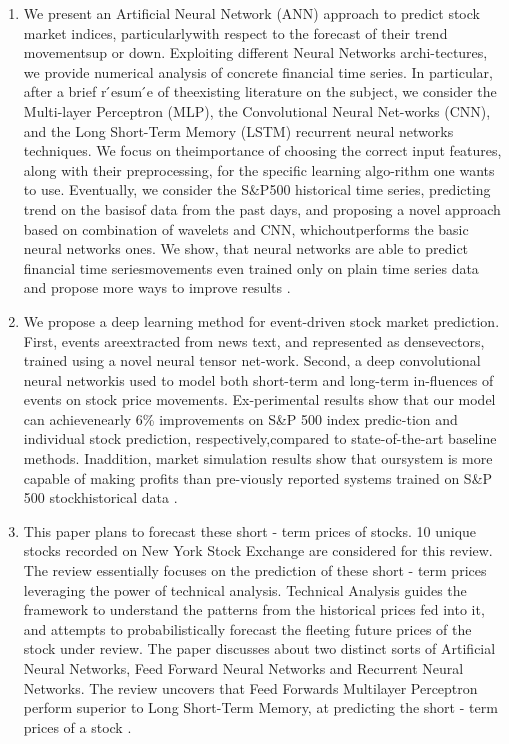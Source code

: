 \documentclass[12pt,journal,compsoc]{IEEEtran}
\begin{document}
\begin{enumerate}
	\item We present an Artificial Neural Network (ANN) approach to predict stock market indices, particularlywith respect to the forecast of their trend movementsup or down.  Exploiting different Neural Networks archi-tectures, we provide numerical analysis of concrete financial time series.  In particular, after a brief r ́esum ́e of theexisting literature on the subject, we consider the Multi-layer Perceptron (MLP), the Convolutional Neural Net-works (CNN), and the Long Short-Term Memory (LSTM) recurrent neural networks techniques. We focus on theimportance of choosing the correct input features, along with their preprocessing, for the specific learning algo-rithm one wants to use.  Eventually, we consider the S\&P500 historical time series, predicting trend on the basisof data from the past days, and proposing a novel approach based on combination of wavelets and CNN, whichoutperforms the basic neural networks ones. We show, that neural networks are able to predict financial time seriesmovements even trained only on plain time series data and propose more ways to improve results \cite{di2016artificial}.
	
	\item We  propose  a  deep  learning  method  for  event-driven  stock  market  prediction.   First,  events  areextracted from news text, and represented as densevectors,  trained  using  a  novel  neural  tensor  net-work. Second, a deep convolutional neural networkis used to model both short-term and long-term in-fluences of events on stock price movements.  Ex-perimental results show that our model can achievenearly 6\% improvements on S\&P 500 index predic-tion  and  individual  stock  prediction,  respectively,compared to state-of-the-art baseline methods.  Inaddition,  market  simulation  results  show  that  oursystem is more capable of making profits than pre-viously reported systems trained on S\&P 500 stockhistorical data \cite{ding2015deep}.
	
	\item  This paper plans to forecast these short - term prices of stocks. 10 unique stocks recorded on New York Stock Exchange are considered for this review. The review essentially focuses on the prediction of these short - term prices leveraging the power of technical analysis. Technical Analysis guides the framework to understand the patterns from the historical prices fed into it, and attempts to probabilistically forecast the fleeting future prices of the stock under review. The paper discusses about two distinct sorts of Artificial Neural Networks, Feed Forward Neural Networks and Recurrent Neural Networks. The review uncovers that Feed Forwards Multilayer Perceptron perform superior to Long Short-Term Memory, at predicting the short - term prices of a stock \cite{khare2017short}.
	

\end{enumerate}
\end{document}
